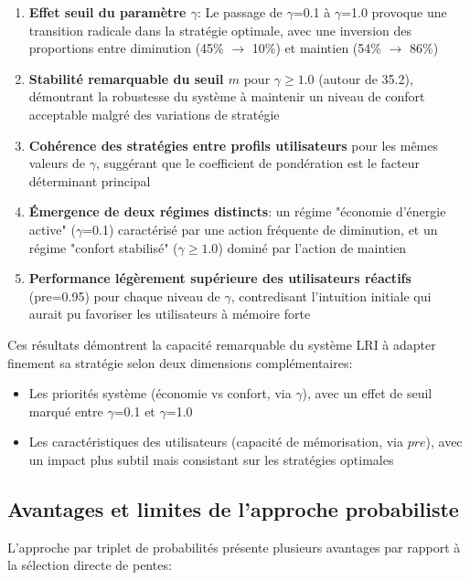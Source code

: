 \begin{enumerate} 
    \item \textbf{Effet seuil du paramètre $\gamma$}: Le passage de $\gamma$=0.1 à $\gamma$=1.0 provoque une transition radicale dans la stratégie optimale, avec une inversion des proportions entre diminution (45\% $\rightarrow$ 10\%) et maintien (54\% $\rightarrow$ 86\%)
    
    \item \textbf{Stabilité remarquable du seuil $m$} pour $\gamma \geq 1.0$ (autour de 35.2), démontrant la robustesse du système à maintenir un niveau de confort acceptable malgré des variations de stratégie
    
    \item \textbf{Cohérence des stratégies entre profils utilisateurs} pour les mêmes valeurs de $\gamma$, suggérant que le coefficient de pondération est le facteur déterminant principal
    
    \item \textbf{Émergence de deux régimes distincts}: un régime "économie d'énergie active" ($\gamma$=0.1) caractérisé par une action fréquente de diminution, et un régime "confort stabilisé" ($\gamma \geq 1.0$) dominé par l'action de maintien
    
    \item \textbf{Performance légèrement supérieure des utilisateurs réactifs} (pre=0.95) pour chaque niveau de $\gamma$, contredisant l'intuition initiale qui aurait pu favoriser les utilisateurs à mémoire forte
\end{enumerate}

Ces résultats démontrent la capacité remarquable du système LRI à adapter finement sa stratégie selon deux dimensions complémentaires: 
\begin{itemize} 
    \item Les priorités système (économie vs confort, via $\gamma$), avec un effet de seuil marqué entre $\gamma$=0.1 et $\gamma$=1.0
    \item Les caractéristiques des utilisateurs (capacité de mémorisation, via $pre$), avec un impact plus subtil mais consistant sur les stratégies optimales
\end{itemize}
\subsection{Avantages et limites de l'approche probabiliste}

L'approche par triplet de probabilités présente plusieurs avantages par rapport à la sélection directe de pentes:

